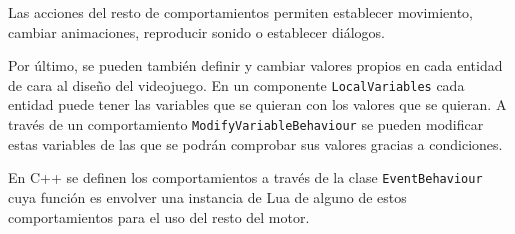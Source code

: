 Las acciones del resto de comportamientos permiten establecer movimiento, cambiar animaciones, reproducir sonido o establecer diálogos. 

\medskip

Por último, se pueden también definir y cambiar valores propios en cada entidad de cara al diseño del videojuego. En un componente \texttt{LocalVariables} cada entidad puede tener las variables que se quieran con los valores que se quieran. A través de un comportamiento \texttt{ModifyVariableBehaviour} se pueden modificar estas variables de las que se podrán comprobar sus valores gracias a condiciones. 

\medskip

En C++ se definen los comportamientos a través de la clase \texttt{EventBehaviour} cuya función es envolver una instancia de Lua de alguno de estos comportamientos para el uso del resto del motor. 